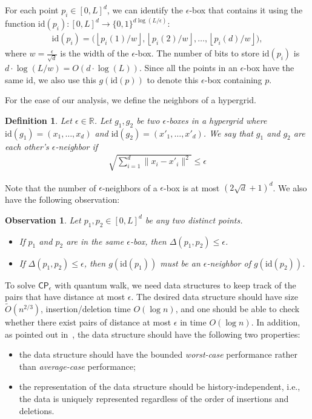 \documentclass[10pt,a4paper]{article}
\newtheorem{definition}[theorem]{Definition}
\newtheorem{observation}[theorem]{Observation}
\newcommand{\wt}{\widetilde}
\newcommand{\eps}{\epsilon}
\renewcommand{\tilde}{\wt}
\renewcommand{\eps}{\epsilon}
\newcommand{\id}{\mathrm{id}}
\newcommand{\eCP}{\mathsf{CP}_{\epsilon}}
\begin{document}
For each point $p_i\in [0,L]^d$, we can identify the $\epsilon$-box that contains it using the function $\id(p_i):[0,L]^d\rightarrow \{0,1\}^{d\log (L/\epsilon)}$:
\begin{align}\label{eq:id_fcn}
    \id(p_i)=\big(\left\lfloor p_i(1)/w\right\rfloor, \left\lfloor p_i(2)/w\right\rfloor, \dots, \left\lfloor p_i(d)/w\right\rfloor\big),
\end{align}
where $w=\frac{\epsilon}{\sqrt{d}}$ is the width of the $\eps$-box. The number of bits to store $\id(p_i)$ is $d\cdot \log(L/w)=O(d\cdot \log(L))$.
Since all the points in an $\epsilon$-box have the same $\id$, we also use this $g(\id(p))$ to denote this $\epsilon$-box containing $p$.

For the ease of our analysis, we define the neighbors of a hypergrid.
\begin{definition}\label{defn:kneighbor}
  Let $\epsilon\in \mathbb{R}$. Let $g_1, g_2$ be two $\eps$-boxes in a hypergrid where $\id(g_1) = (x_1,\dots,x_d)$ and $\id(g_2) = (x'_1,\dots,x'_d)$. We say that $g_1$ and $g_2$ are each other's \emph{$\epsilon$-neighbor} if 
\begin{align}
    \sqrt{\sum_{i=1}^d \|x_i-x'_i\|^2} \leq \epsilon
\end{align}
\end{definition}

Note that the number of $\epsilon$-neighbors of a $\epsilon$-box is at most $(2\sqrt{d}+1)^d$. We also have the following observation:
\begin{observation}\label{obs:2step}
Let $p_1,p_2\in [0,L]^d$ be any two distinct points.  
\begin{itemize}
    \item If $p_1$ and $p_2$ are in the same $\epsilon$-box, then $\Delta(p_1, p_2) \leq \epsilon$.
    \item If $\Delta(p_1, p_2)\leq \epsilon$, then $g(\id(p_1))$ must be an $\epsilon$-neighbor of $g(\id(p_2))$. 
\end{itemize} 
\end{observation}

To solve $\eCP$ with quantum walk, we need data structures to keep track of the pairs that have distance at most $\epsilon$. The desired data structure should have size $\tilde{O}(n^{2/3})$, insertion/deletion time $O(\log n)$, and one should be able to check whether there exist pairs of distance at most $\epsilon$ in time $O(\log n)$. In addition, as pointed out in~\cite{r5}, the data structure should have the following two properties:
\begin{itemize}
  \item the data structure should have the bounded \emph{worst-case} performance rather than \emph{average-case} performance;
  \item the representation of the data structure should be history-independent, i.e., the data is uniquely represented regardless of the order of insertions and deletions.
\end{itemize}
\end{document}
